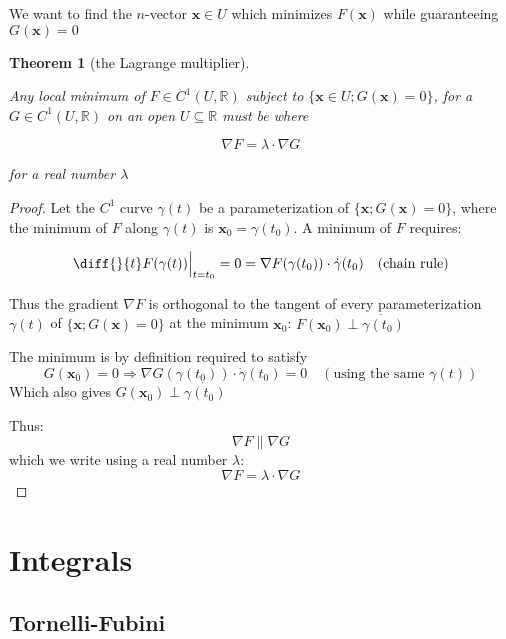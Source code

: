 \documentclass{article}
\theoremstyle{plain}
\newtheorem{theorem}{Theorem}
\begin{document}
We want to find the $n$-vector $\mathbf x \in U$ which minimizes $F(\mathbf x)$
while guaranteeing $G(\mathbf x) = 0$

\begin{theorem}[the Lagrange multiplier]
\label{th:lagrangem}

    Any local minimum of $F \in C^1(U, \mathbb R)$ subject to 
    $\{ \mathbf x  \in U; G(\mathbf x) = 0\}$, for a $G \in C^1(U, \mathbb R)$
    on an open $U \subseteq \mathbb R$
    must be where

    \begin{equation}\label{eq:lagrangem}
        \nabla F = \lambda \cdot \nabla G
    \end{equation}
    

    for a real number $\lambda$
    
\end{theorem}

\begin{proof}
    Let the $C^1$ curve $\gamma(t)$ be a parameterization of $\{\mathbf x; G(\mathbf x) = 0 \}$, where the minimum of $F$ along $\gamma(t)$ is $\mathbf x_0 = \gamma(t_0)$.   
    A minimum of $F$ requires:

    $$\diff{}{t} F(\gamma(t)) \Big |_{t = t_0}= 0 = \nabla F(\gamma(t_0)) \cdot \dot{\gamma}(t_0) \quad \textrm{(chain rule)}$$

    Thus the gradient $\nabla F$ is orthogonal to the tangent of 
    every parameterization $\gamma(t)$ of $\{\mathbf x; G(\mathbf x) = 0 \}$
    at the minimum $\mathbf x_0$: $F(\mathbf x_0) \perp \dot{\gamma(t_0)}$

    The minimum is by definition required to satisfy
    $$G(\mathbf x_0) = 0 \Rightarrow \nabla G(\gamma(t_0)) \cdot \dot{\gamma}(t_0) = 0 \quad (\textrm{using the same } \gamma(t))$$
    Which also gives $G(\mathbf x_0) \perp \dot{\gamma(t_0)}$

    Thus:
    $$\nabla F \parallel \nabla G$$
    which we write using a real number $\lambda$:
    $$\nabla F = \lambda \cdot \nabla G$$



\end{proof}




\section{Integrals}

\subsection{Tornelli-Fubini}
\end{document}
